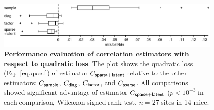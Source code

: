 \begin{figure}
\begin{fullpage}

        \begin{center}
        \includegraphics[width=\textwidth]{./figures/Supp02.eps}
        \end{center}

\caption[Performance evaluation of correlations estimators with respect to quadratic loss]{
{\bf Performance evaluation of correlation estimators with respect to quadratic loss.} 
The plot shows the quadratic loss (Eq.~\ref{eq:quad}) of estimator $C_{\sf sparse+latent}$ relative to the other estimators: $C_{\sf sample}$, $C_{\sf diag}$, $C_{\sf factor}$, and $C_{\sf sparse}$. All comparisons showed significant advantage of estimator $C_{\sf sparse+latent}$ ($p<10^{-3}$ in each comparison, Wilcoxon signed rank test, $n=27$ sites in 14 mice.
}\label{fig:S2}
\end{fullpage}
\end{figure}
